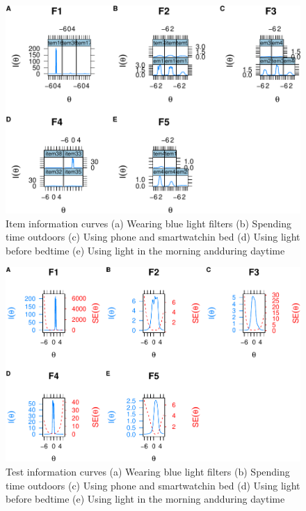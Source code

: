 \documentclass[
  english,
  man]{apa6}
\begin{document}
\begin{figure}
\includegraphics[width=1\linewidth,height=1.2\textheight]{manuscript_files/figure-latex/itmeinfo-1} \caption{Item information curves (a) Wearing blue light filters (b) Spending time outdoors (c) Using phone and smartwatchin bed (d) Using light before bedtime (e) Using light in the morning andduring daytime}\label{fig:itmeinfo}
\end{figure}

\begin{figure}
\includegraphics[width=1\linewidth,height=1.2\textheight]{manuscript_files/figure-latex/Testinfo-1} \caption{Test information curves (a) Wearing blue light filters (b) Spending time outdoors (c) Using phone and smartwatchin bed (d) Using light before bedtime (e) Using light in the morning andduring daytime}\label{fig:Testinfo}
\end{figure}
\end{document}
